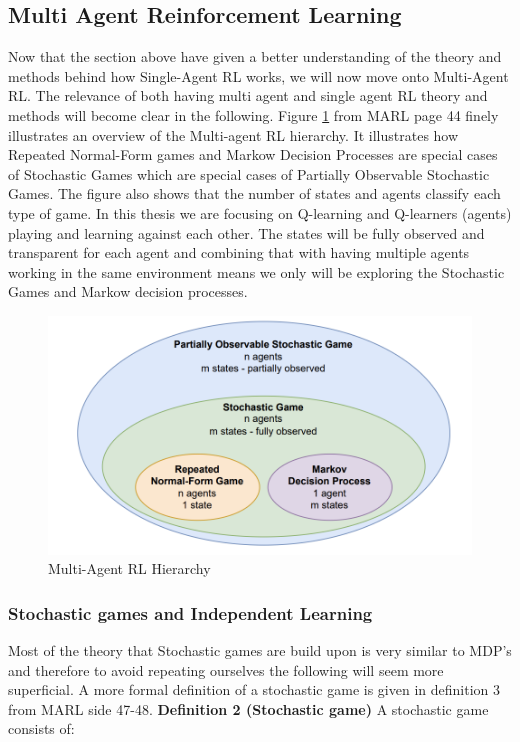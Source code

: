 \documentclass{article}
\begin{document}
\subsection{Multi Agent Reinforcement Learning}
Now that the section above have given a better understanding of the theory and methods behind how Single-Agent RL works, we will now move onto Multi-Agent RL. The relevance of both having multi agent and single agent RL theory and methods will become clear in the following. Figure \ref{fig:marside44} from MARL page 44 finely illustrates an overview of the Multi-agent RL hierarchy. It illustrates how Repeated Normal-Form games and Markow Decision Processes are special cases of Stochastic Games which are special cases of Partially Observable Stochastic Games. The figure also shows that the number of states and agents classify each type of game. In this thesis we are focusing on Q-learning and Q-learners (agents) playing and learning against each other. The states will be fully observed and transparent for each agent and combining that with having multiple agents working in the same environment means we only will be exploring the Stochastic Games and Markow decision processes.
\begin{figure}[H]
    \centering
    \includegraphics[width=0.5\linewidth]{Multi-agent-figure.png}
    \caption{Multi-Agent RL Hierarchy }
    \label{fig:marside44}
\end{figure}
\subsubsection{Stochastic games and Independent Learning}
Most of the theory that Stochastic games are build upon is very similar to MDP's and therefore to avoid repeating ourselves the following will seem more superficial. A more formal definition of a stochastic game is given in definition 3 from MARL side 47-48. 
\newline
\textbf{Definition 2 (Stochastic game)} A stochastic game consists of:
\end{document}
